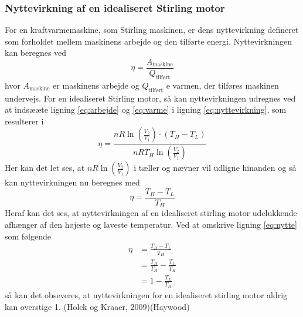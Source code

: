 \documentclass[SRC.tex]{subfiles}
\begin{document}
	\subsubsection{Nyttevirkning af en idealiseret Stirling motor}
	For en kraftvarmemaskine, som Stirling maskinen, er dens nyttevirkning defineret som forholdet mellem maskinens arbejde og den tilførte energi. Nyttevirkningen kan beregnes ved 
	\begin{equation}
		\eta = \frac{A_{\text{maskine}}}{Q_{\text{tilført}}}
		\label{eq:nyttevirkning}
	\end{equation}
	hvor \(A_{\text{maskine}}\) er maskinens arbejde og \(Q_{\text{tilført}}\) e varmen, der tilføres maskinen undervejs. For en idealiseret Stirling motor, så kan nyttevirkningen udregnes ved at indsææte ligning \eqref{eq:arbejde} og \eqref{eq:varme} i ligning \eqref{eq:nyttevirkning}, som resulterer i
	\begin{equation}
		\eta = \frac{nR\ln\left(\frac{V_2}{V_1}\right)\cdot (T_H - T_L)}{nRT_H\ln\left(\frac{V_2}{V_1}\right)} 
	\end{equation}
	Her kan det let ses, at \(nR\ln\left(\frac{V_2}{V_1}\right)\) i tæller og nævner vil udligne hinanden og så kan nyttevirkningen nu beregnes med
	\begin{equation}
		\eta = \frac{T_H-T_L}{T_H}
		\label{eq:nytte}
	\end{equation}
	Heraf kan det ses, at nyttevirkningen af en idealiseret stirling motor udelukkende afhænger af den højeste og laveste temperatur. Ved at omskrive ligning \eqref{eq:nytte} som følgende
	\begin{subequations}
		\begin{align}
			\eta &= \frac{T_H-T_L}{T_H} \\
			 	 &= \frac{T_H}{T_H}-\frac{T_L}{T_H} \\
			 	 &= 1 -\frac{T_L}{T_H}
		\end{align}
	\end{subequations}
	så kan det obseveres, at nyttevirkningen for en idealiseret stirling motor aldrig kan overstige 1.
	(Holck og Kraaer, 2009)​(Haywood) 
\end{document}
